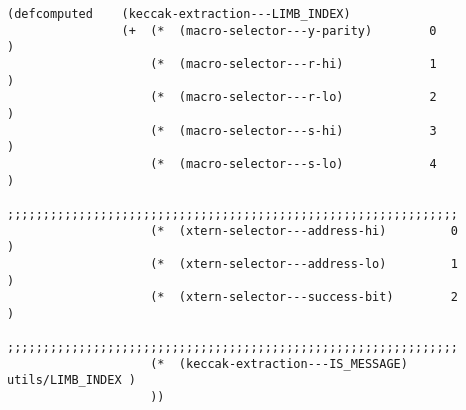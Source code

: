 \documentclass[varwidth=\maxdimen,margin=0.5cm,multi={verbatim}]{standalone}
\begin{document}
\begin{verbatim}
(defcomputed    (keccak-extraction---LIMB_INDEX)
                (+  (*  (macro-selector---y-parity)        0                      )
                    (*  (macro-selector---r-hi)            1                      )
                    (*  (macro-selector---r-lo)            2                      )
                    (*  (macro-selector---s-hi)            3                      )
                    (*  (macro-selector---s-lo)            4                      )
                    ;;;;;;;;;;;;;;;;;;;;;;;;;;;;;;;;;;;;;;;;;;;;;;;;;;;;;;;;;;;;;;;
                    (*  (xtern-selector---address-hi)         0                   )
                    (*  (xtern-selector---address-lo)         1                   )
                    (*  (xtern-selector---success-bit)        2                   )
                    ;;;;;;;;;;;;;;;;;;;;;;;;;;;;;;;;;;;;;;;;;;;;;;;;;;;;;;;;;;;;;;;
                    (*  (keccak-extraction---IS_MESSAGE)         utils/LIMB_INDEX )
                    ))

\end{verbatim}
\end{document}
